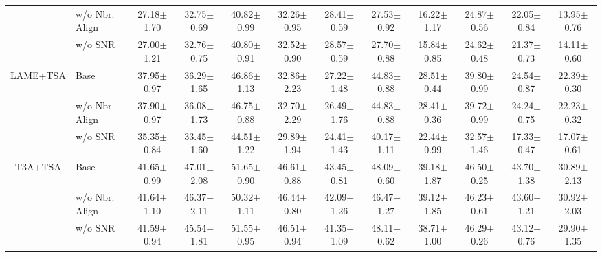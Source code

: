\begin{table}[h]
\begin{center}
{\begin{tabular}{c|l|cccccccccc}
&w/o Nbr. Align &27.18$\pm$1.70 &32.75$\pm$0.69 &40.82$\pm$0.99 &32.26$\pm$0.95 &28.41$\pm$0.59 &27.53$\pm$0.92 &16.22$\pm$1.17 &24.87$\pm$0.56 &22.05$\pm$0.84 &13.95$\pm$0.76
 \\
&w/o SNR &27.00$\pm$1.21 &32.76$\pm$0.75 &40.80$\pm$0.91 &32.52$\pm$0.90 &28.57$\pm$0.59 &27.70$\pm$0.88 &15.84$\pm$0.85 &24.62$\pm$0.48 &21.37$\pm$0.73 &14.11$\pm$0.60
\\
 \midrule
\multirow{3}{*}{LAME+TSA} &\cellcolor{red!10}Base  &\cellcolor{red!10}37.95$\pm$0.97 
&\cellcolor{red!10}36.29$\pm$1.65 &\cellcolor{red!10}46.86$\pm$1.13 &\cellcolor{red!10}32.86$\pm$2.23 &\cellcolor{red!10}27.22$\pm$1.48 &\cellcolor{red!10}44.83$\pm$0.88 &\cellcolor{red!10}28.51$\pm$0.44 &\cellcolor{red!10}39.80$\pm$0.99 &\cellcolor{red!10}24.54$\pm$0.87 &\cellcolor{red!10}22.39$\pm$0.30
\\
&w/o Nbr. Align &37.90$\pm$0.97 &36.08$\pm$1.73 &46.75$\pm$0.88 &32.70$\pm$2.29 &26.49$\pm$1.76 &44.83$\pm$0.88 &28.41$\pm$0.36 &39.72$\pm$0.99 &24.24$\pm$0.75 &22.23$\pm$0.32 
 \\
 &w/o SNR &35.35$\pm$0.84 &33.45$\pm$1.60 &44.51$\pm$1.22 &29.89$\pm$1.94 &24.41$\pm$1.43 &40.17$\pm$1.11 &22.44$\pm$0.99 &32.57$\pm$1.46 &17.33$\pm$0.47 &17.07$\pm$0.61
\\
 \midrule
\multirow{3}{*}{T3A+TSA} &\cellcolor{red!10}Base
&\cellcolor{red!10}41.65$\pm$0.99 &\cellcolor{red!10}47.01$\pm$2.08 &\cellcolor{red!10}51.65$\pm$0.90 &\cellcolor{red!10}46.61$\pm$0.88 &\cellcolor{red!10}43.45$\pm$0.81 &\cellcolor{red!10}48.09$\pm$0.60 &\cellcolor{red!10}39.18$\pm$1.87 &\cellcolor{red!10}46.50$\pm$0.25 &\cellcolor{red!10}43.70$\pm$1.38 &\cellcolor{red!10}30.89$\pm$2.13 
 \\
 &w/o Nbr. Align &41.64$\pm$1.10 &46.37$\pm$2.11 &50.32$\pm$1.11 &46.44$\pm$0.80 &42.09$\pm$1.26 &46.47$\pm$1.27 &39.12$\pm$1.85 &46.23$\pm$0.61 &43.60$\pm$1.21 &30.92$\pm$2.03
 \\
 &w/o SNR &41.59$\pm$0.94 &45.54$\pm$1.81 &51.55$\pm$0.95 &46.51$\pm$0.94 &41.35$\pm$1.09 &48.11$\pm$0.62 &38.71$\pm$1.00 &46.29$\pm$0.26 &43.12$\pm$0.76 &29.90$\pm$1.35
 \\
\bottomrule
\end{tabular}
}
\end{center}
\end{table}


\newpage

